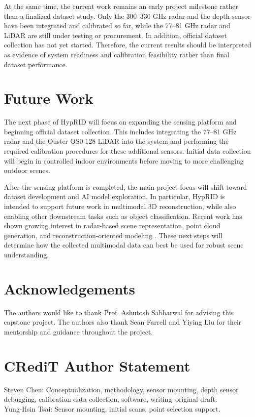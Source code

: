 \documentclass[conference]{IEEEtran}
\begin{document}
At the same time, the current work remains an early project milestone rather than a finalized dataset study. Only the 300--330 GHz radar and the depth sensor have been integrated and calibrated so far, while the 77--81 GHz radar and LiDAR are still under testing or procurement. In addition, official dataset collection has not yet started. Therefore, the current results should be interpreted as evidence of system readiness and calibration feasibility rather than final dataset performance.

\section{Future Work}

The next phase of HypRID will focus on expanding the sensing platform and beginning official dataset collection. This includes integrating the 77--81 GHz radar and the Ouster OS0-128 LiDAR into the system and performing the required calibration procedures for these additional sensors. Initial data collection will begin in controlled indoor environments before moving to more challenging outdoor scenes.

After the sensing platform is completed, the main project focus will shift toward dataset development and AI model exploration. In particular, HypRID is intended to support future work in multimodal 3D reconstruction, while also enabling other downstream tasks such as object classification. Recent work has shown growing interest in radar-based scene representation, point cloud generation, and reconstruction-oriented modeling \cite{prabhakara2022high,borts2024radar,huang2024dart,rafidashti2025neuradar}. These next steps will determine how the collected multimodal data can best be used for robust scene understanding.
\section*{Acknowledgements}

The authors would like to thank Prof. Ashutosh Sabharwal for advising this capstone project. The authors also thank Sean Farrell and Yiying Liu for their mentorship and guidance throughout the project.

\section*{CRediT Author Statement}

Steven Chen: Conceptualization, methodology, sensor mounting, depth sensor debugging, calibration data collection, software, writing--original draft.\\

Yung-Hsin Tsai: Sensor mounting, initial scans, point selection support.




\end{document}
